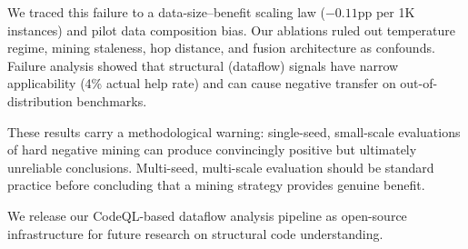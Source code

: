 \documentclass[11pt,a4paper]{article}
\begin{document}
We traced this failure to a data-size--benefit scaling law ($-0.11$pp per 1K instances) and pilot data composition bias.
Our ablations ruled out temperature regime, mining staleness, hop distance, and fusion architecture as confounds.
Failure analysis showed that structural (dataflow) signals have narrow applicability (4\% actual help rate) and can cause negative transfer on out-of-distribution benchmarks.

These results carry a methodological warning: single-seed, small-scale evaluations of hard negative mining can produce convincingly positive but ultimately unreliable conclusions.
Multi-seed, multi-scale evaluation should be standard practice before concluding that a mining strategy provides genuine benefit.

We release our CodeQL-based dataflow analysis pipeline as open-source infrastructure for future research on structural code understanding.
\end{document}
